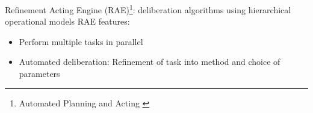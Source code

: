 \begin{frame}{Refinement Acting Engine (RAE)\footnote{Automated Planning and Acting \cite{ghallabAutomatedPlanningActing2016}}: deliberation algorithms using hierarchical operational models}
    RAE features:
    \begin{itemize}
        \item Perform multiple tasks in parallel
        \pause
        \item Automated deliberation: Refinement of task into method and choice of parameters
    \end{itemize}
    \centering
        
\end{frame}
    

